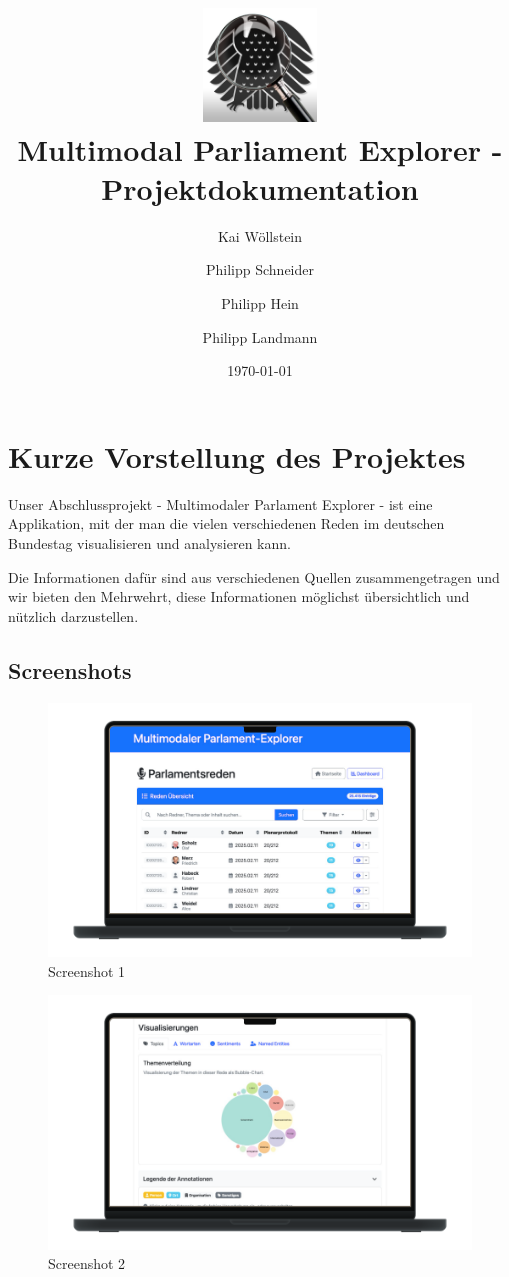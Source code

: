 \documentclass[ngerman]{article}
\title{
    \includegraphics[width=3cm]{assets/icon.png}\\
    \textbf{Multimodal Parliament Explorer - Projektdokumentation}
}
\author{
    Kai Wöllstein
    \and Philipp Schneider
    \and Philipp Hein
    \and Philipp Landmann}
\date{\today}
\begin{document}
    \maketitle
    \tableofcontents
    \newpage

    \section{Kurze Vorstellung des Projektes}

    Unser Abschlussprojekt - Multimodaler Parlament Explorer - ist eine Applikation, mit der man die vielen verschiedenen Reden im deutschen Bundestag visualisieren und analysieren kann.

    Die Informationen dafür sind aus verschiedenen Quellen zusammengetragen und wir bieten den Mehrwehrt, diese Informationen möglichst übersichtlich und nützlich darzustellen.

    \subsection{Screenshots}

    \begin{figure}[h]
        \centering
        \includegraphics[width=0.9\linewidth]{assets/screenshot-1.png}
        \caption{Screenshot 1}
        \label{fig:screenshot-1}
    \end{figure}

    \begin{figure}[h]
        \centering
        \includegraphics[width=0.9\linewidth]{assets/screenshot-2.png}
        \caption{Screenshot 2}
        \label{fig:screenshot-2}
    \end{figure}
\end{document}
